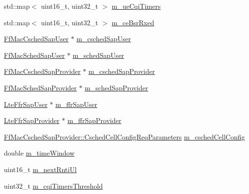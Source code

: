 \begin{DoxyCompactItemize}
\item 
std\+::map$<$ uint16\+\_\+t, uint32\+\_\+t $>$ \hyperlink{classns3_1_1TdBetFfMacScheduler_a89b7106fc5de30b9153316aa3ea2d368}{m\+\_\+ue\+Cqi\+Timers}
\item 
std\+::map$<$ uint16\+\_\+t, uint32\+\_\+t $>$ \hyperlink{classns3_1_1TdBetFfMacScheduler_ab10364d54dad2ec2afed0c168cdad4d3}{m\+\_\+ce\+Bsr\+Rxed}
\item 
\hyperlink{classns3_1_1FfMacCschedSapUser}{Ff\+Mac\+Csched\+Sap\+User} $\ast$ \hyperlink{classns3_1_1TdBetFfMacScheduler_a0d14275109333f2c020da427a24430a4}{m\+\_\+csched\+Sap\+User}
\item 
\hyperlink{classns3_1_1FfMacSchedSapUser}{Ff\+Mac\+Sched\+Sap\+User} $\ast$ \hyperlink{classns3_1_1TdBetFfMacScheduler_aac1731b516e0a6e45d76828f6c72eaa5}{m\+\_\+sched\+Sap\+User}
\item 
\hyperlink{classns3_1_1FfMacCschedSapProvider}{Ff\+Mac\+Csched\+Sap\+Provider} $\ast$ \hyperlink{classns3_1_1TdBetFfMacScheduler_a9c1827706381efe9cb15b1cdd0166ecc}{m\+\_\+csched\+Sap\+Provider}
\item 
\hyperlink{classns3_1_1FfMacSchedSapProvider}{Ff\+Mac\+Sched\+Sap\+Provider} $\ast$ \hyperlink{classns3_1_1TdBetFfMacScheduler_a756f79b8f29e6c52fb105fd75444da36}{m\+\_\+sched\+Sap\+Provider}
\item 
\hyperlink{classns3_1_1LteFfrSapUser}{Lte\+Ffr\+Sap\+User} $\ast$ \hyperlink{classns3_1_1TdBetFfMacScheduler_a89db05cbe6e553bf45483415f89f2e77}{m\+\_\+ffr\+Sap\+User}
\item 
\hyperlink{classns3_1_1LteFfrSapProvider}{Lte\+Ffr\+Sap\+Provider} $\ast$ \hyperlink{classns3_1_1TdBetFfMacScheduler_a0356ae243fdb61a3544583b17196fef1}{m\+\_\+ffr\+Sap\+Provider}
\item 
\hyperlink{structns3_1_1FfMacCschedSapProvider_1_1CschedCellConfigReqParameters}{Ff\+Mac\+Csched\+Sap\+Provider\+::\+Csched\+Cell\+Config\+Req\+Parameters} \hyperlink{classns3_1_1TdBetFfMacScheduler_a3e53aae0259501332769cd6ca4b74800}{m\+\_\+csched\+Cell\+Config}
\item 
double \hyperlink{classns3_1_1TdBetFfMacScheduler_abedd8d532189797f7f33af0e2a49427e}{m\+\_\+time\+Window}
\item 
uint16\+\_\+t \hyperlink{classns3_1_1TdBetFfMacScheduler_affbc3b6450778e77fbc0e20cb575d1b0}{m\+\_\+next\+Rnti\+Ul}
\item 
uint32\+\_\+t \hyperlink{classns3_1_1TdBetFfMacScheduler_ad423d7c181e089b37159502bad92bccd}{m\+\_\+cqi\+Timers\+Threshold}
\item 

\end{DoxyCompactItemize}
